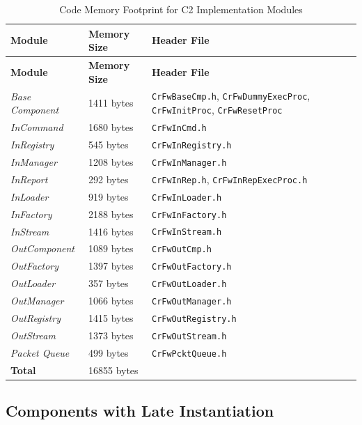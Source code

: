 \documentclass[a4paper,10pt]{article}
\begin{document}
\begin{longtable}{|p{2.7cm}|p{2.7cm}|p{4.7cm}|}
\caption{Code Memory Footprint for C2 Implementation Modules} \label{tab:memFootprint}\\
\rowcolor{light-gray}
\textbf{Module} & \textbf{Memory Size} & \textbf{Header File} \\
\hline\hline
\endfirsthead
\rowcolor{light-gray}
\textbf{Module} & \textbf{Memory Size} & \textbf{Header File} \\
\hline\hline
\endhead
\emph{Base Component} & 1411 bytes & \texttt{CrFwBaseCmp.h}, \texttt{CrFwDummyExecProc}, \texttt{CrFwInitProc}, \texttt{CrFwResetProc} \\
\hline
\emph{InCommand} & 1680 bytes & \texttt{CrFwInCmd.h} \\
\hline
\emph{InRegistry} & 545 bytes & \texttt{CrFwInRegistry.h} \\
\hline
\emph{InManager} & 1208 bytes & \texttt{CrFwInManager.h} \\
\hline
\emph{InReport} & 292 bytes & \texttt{CrFwInRep.h}, \texttt{CrFwInRepExecProc.h} \\
\hline
\emph{InLoader} & 919 bytes & \texttt{CrFwInLoader.h} \\
\hline
\emph{InFactory} & 2188 bytes & \texttt{CrFwInFactory.h} \\
\hline
\emph{InStream} & 1416 bytes & \texttt{CrFwInStream.h} \\
\hline
\emph{OutComponent} & 1089 bytes & \texttt{CrFwOutCmp.h} \\
\hline
\emph{OutFactory} & 1397 bytes & \texttt{CrFwOutFactory.h} \\
\hline
\emph{OutLoader} & 357 bytes & \texttt{CrFwOutLoader.h} \\
\hline
\emph{OutManager} & 1066 bytes & \texttt{CrFwOutManager.h} \\
\hline
\emph{OutRegistry} & 1415 bytes & \texttt{CrFwOutRegistry.h} \\
\hline
\emph{OutStream} & 1373 bytes & \texttt{CrFwOutStream.h} \\
\hline
\emph{Packet Queue} & 499 bytes & \texttt{CrFwPcktQueue.h} \\
\hline
\textbf{Total} & 16855 bytes &  \\
\hline
\end{longtable}

\subsection{Components with Late Instantiation}
\end{document}
